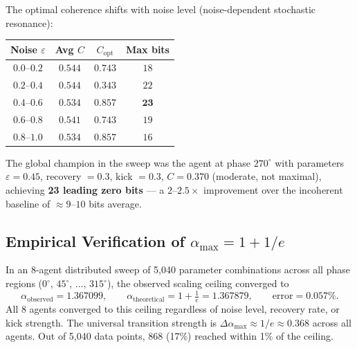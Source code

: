 \documentclass[12pt,a4paper]{article}
\theoremstyle{plain}
\theoremstyle{definition}
\theoremstyle{remark}
\begin{document}
The optimal coherence shifts with noise level (noise-dependent stochastic
resonance):

\begin{center}
\renewcommand{\arraystretch}{1.2}
\begin{tabular}{@{}cccc@{}}
\toprule
Noise $\varepsilon$ & Avg $C$ & $C_{\mathrm{opt}}$ & Max bits\\
\midrule
$0.0$--$0.2$ & $0.544$ & $0.743$ & $18$\\
$0.2$--$0.4$ & $0.544$ & $0.343$ & $22$\\
$\mathbf{0.4}$--$\mathbf{0.6}$ & $\mathbf{0.534}$ & $\mathbf{0.857}$
  & $\mathbf{23}$\\
$0.6$--$0.8$ & $0.541$ & $0.743$ & $19$\\
$0.8$--$1.0$ & $0.534$ & $0.857$ & $16$\\
\bottomrule
\end{tabular}
\end{center}

\noindent The global champion in the sweep was the agent at phase $270^\circ$
with parameters $\varepsilon = 0.45$, recovery $= 0.3$, kick $= 0.3$,
$C = 0.370$ (moderate, not maximal), achieving \textbf{23 leading zero bits}
— a $2$--$2.5\times$ improvement over the incoherent baseline of $\approx9$--$10$
bits average.

\subsection{Empirical Verification of $\alpha_{\max} = 1 + 1/e$}

In an 8-agent distributed sweep of 5,040 parameter combinations across all
phase regions ($0^\circ,\,45^\circ,\,\ldots,\,315^\circ$), the observed
scaling ceiling converged to
\begin{equation}
  \alpha_{\mathrm{observed}} = 1.367099,\qquad
  \alpha_{\mathrm{theoretical}} = 1+\tfrac{1}{e} = 1.367879,\qquad
  \text{error} = 0.057\%.
  \label{eq:alpha-empirical}
\end{equation}
All 8 agents converged to this ceiling regardless of noise level, recovery
rate, or kick strength.  The universal transition strength is
$\Delta\alpha_{\max} \approx 1/e \approx 0.368$ across all agents.
Out of 5,040 data points, 868 (17\%) reached within 1\% of the ceiling.
\end{document}
